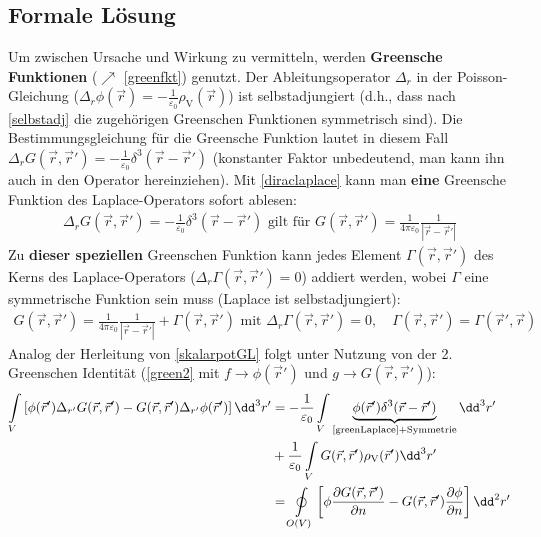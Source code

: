  \subsection{Formale Lösung} \label{form}
		 Um zwischen Ursache und Wirkung zu vermitteln, werden \textbf{Greensche Funktionen} ($\nearrow$ \ref{greenfkt}) genutzt. Der Ableitungsoperator $\Delta_r$ in der Poisson-Gleichung ($\Delta _r \phi(\vec{r} ) = -\frac{1}{\varepsilon_0} \rho_\text{V}(\vec{r} )$) ist selbstadjungiert (d.h., dass nach \ref{selbstadj} die zugehörigen Greenschen Funktionen symmetrisch sind). Die Bestimmungsgleichung für die Greensche Funktion lautet in diesem Fall $\Delta _rG(\vec{r} ,\vec{r}' ) = -\frac{1}{\varepsilon_0} \delta^3(\vec{r} -\vec{r}' )$ (konstanter Faktor unbedeutend, man kann ihn auch in den Operator hereinziehen). Mit \ref{diraclaplace} kann man \textbf{eine} Greensche Funktion des Laplace-Operators sofort ablesen:
		        \begin{equation}\label{greenLaplace}\begin{split}
				        \boxed{ \Delta _r G(\vec{r} ,\vec{r}' ) = -\frac{1}{\varepsilon_0} \delta^3(\vec{r} -\vec{r}' ) \text{ gilt für } G(\vec{r} ,\vec{r}' ) = \frac{1}{4\pi\varepsilon_0}\frac{1}{|\vec{r} -\vec{r}' |} }
			        \end{split}\end{equation}
		   Zu \textbf{dieser speziellen} Greenschen Funktion kann jedes Element $\Gamma(\vec{r} ,\vec{r}' )$ des Kerns des Laplace-Operators ($\Delta _r \Gamma(\vec{r} ,\vec{r}' ) = 0$) addiert werden, wobei $\Gamma$ eine symmetrische Funktion sein muss (Laplace ist selbstadjungiert):
		        \begin{equation}\label{gammaLaplace}\begin{split}
				        \boxed{G(\vec{r} ,\vec{r}' ) = \frac{1}{4\pi\varepsilon_0}\frac{1}{|\vec{r} -\vec{r}' |} + \Gamma(\vec{r} ,\vec{r}' ) \text{ mit } \Delta _r \Gamma(\vec{r} ,\vec{r}' ) = 0,\quad \Gamma(\vec{r} ,\vec{r}' ) =\Gamma(\vec{r}' ,\vec{r} )}
			        \end{split}\end{equation}
			   Analog der Herleitung von \ref{skalarpotGL} folgt unter Nutzung von der 2. Greenschen Identität (\ref{green2} mit $f\to\phi(\vec{r}' )$ und $g\to G(\vec{r} ,\vec{r}' )$):
			        \begin{equation*}\begin{split}
					        \int\limits_V \left[  \phi(\vec{r}' ) {\Delta _{ r'} G(\vec{r} ,\vec{r}' )}  - G(\vec{r} ,\vec{r}' ) \Delta _{ r'}  \phi(\vec{r}' ) \right] \dd^3 r' &=  -\frac{1}{\varepsilon_0} \int\limits_V  \underbrace{\phi(\vec{r}' ) \delta^3 (\vec{r}  - \vec{r}' )}_{\text{\ref{greenLaplace}+Symmetrie}} \dd^3r' \\
					        &+ \frac{1}{\varepsilon_0} \int\limits_V G(\vec{r} ,\vec{r}' )\rho_\text{V}(\vec{r}' ) \dd^3r'\\
					        &= \oint\limits_{O(V)} \left[ \phi\frac{\partial G(\vec{r} ,\vec{r}' )}{\partial n}
						        - G(\vec{r} ,\vec{r}' )\frac{\partial\phi}{\partial n} \right] \dd^2r'
				        \end{split}\end{equation*}
